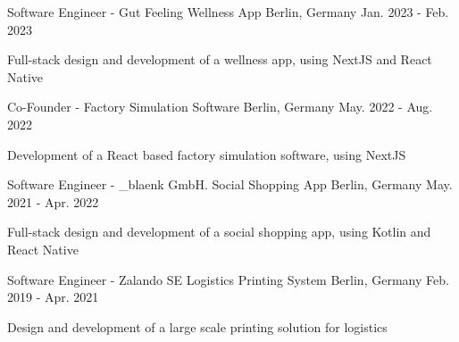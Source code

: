 

\begin{cventries}

\cventry
{Software Engineer - \The Gut Feeling}
{Wellness App}
{Berlin, Germany}
{Jan. 2023 - Feb. 2023}
{
  \begin{cvitems}
    \item {Full-stack design and development of a wellness app, using NextJS and React Native}
  \end{cvitems}
}


\cventry
{Co-Founder - \DigitalPlant}
{Factory Simulation Software}
{Berlin, Germany}
{May. 2022 - Aug. 2022}
{
  \begin{cvitems}
    \item {Development of a React based factory simulation software, using NextJS}
  \end{cvitems}
}   

\cventry
{Software Engineer - \_blaenk GmbH.}
{Social Shopping App}
{Berlin, Germany}
{May. 2021 - Apr. 2022}
{
  \begin{cvitems}
    \item {Full-stack design and development of a social shopping app, using Kotlin and React Native}
  \end{cvitems}
}   

  \cventry
    {Software Engineer - Zalando SE}
    {Logistics Printing System}
    {Berlin, Germany}
    {Feb. 2019 - Apr. 2021}
    {
      \begin{cvitems}
        \item {Design and development of a large scale printing solution for logistics}
      \end{cvitems}
    } 




\end{cventries}
